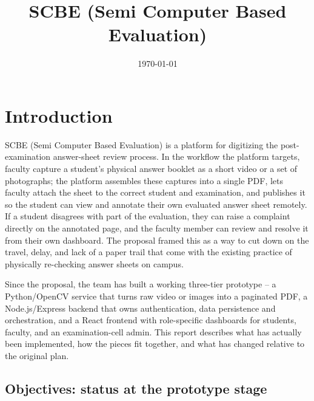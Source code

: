 \documentclass[11pt,a4paper]{article}
\title{SCBE (Semi Computer Based Evaluation)}
\author{
  \specifyauthor{Gurneet Singh Ahuja}{1024170014}{gahuja\_be24@thapar.edu}
  \and
  \specifyauthor{Alla Harshith}{1024170007}{aharshith\_be24@thapar.edu}
  \and
  \specifyauthor{Arpit Goyal}{1024170021}{agoyal6\_be24@thapar.edu}
}
\date{\today}
\begin{document}
\maketitle
\tableofcontents
\vspace{1em}

\section{Introduction}

SCBE (Semi Computer Based Evaluation) is a platform for digitizing the post-examination
answer-sheet review process. In the workflow the platform targets, faculty capture a
student's physical answer booklet as a short video or a set of photographs; the platform
assembles these captures into a single PDF, lets faculty attach the sheet to the correct
student and examination, and publishes it so the student can view and annotate their own
evaluated answer sheet remotely. If a student disagrees with part of the evaluation, they
can raise a complaint directly on the annotated page, and the faculty member can review and
resolve it from their own dashboard. The proposal framed this as a way to cut down on the
travel, delay, and lack of a paper trail that come with the existing practice of physically
re-checking answer sheets on campus.

Since the proposal, the team has built a working three-tier prototype -- a Python/OpenCV
service that turns raw video or images into a paginated PDF, a Node.js/Express backend that
owns authentication, data persistence and orchestration, and a React frontend with
role-specific dashboards for students, faculty, and an examination-cell admin. This report
describes what has actually been implemented, how the pieces fit together, and what has
changed relative to the original plan.

\subsection{Objectives: status at the prototype stage}
\end{document}
